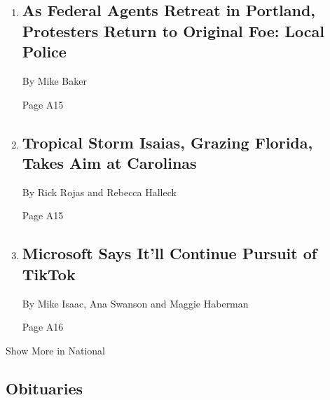 \begin{enumerate}
\def\labelenumi{\arabic{enumi}.}
\item
  \href{/2020/08/02/us/portland-protests-.html}{}

  \hypertarget{as-federal-agents-retreat-in-portland-protesters-return-to-original-foe-local-police-1}{%
  \subsection{As Federal Agents Retreat in Portland, Protesters Return
  to Original Foe: Local
  Police}\label{as-federal-agents-retreat-in-portland-protesters-return-to-original-foe-local-police-1}}

  By Mike Baker

  Page A15
\item
  \href{/2020/08/02/us/tropical-storm-isaias-florida-carolina.html}{}

  \hypertarget{tropical-storm-isaias-grazing-florida-takes-aim-at-carolinas}{%
  \subsection{Tropical Storm Isaias, Grazing Florida, Takes Aim at
  Carolinas}\label{tropical-storm-isaias-grazing-florida-takes-aim-at-carolinas}}

  By Rick Rojas and Rebecca Halleck

  Page A15
\item
  \href{/2020/08/02/business/economy/trump-tiktok-china-national-security.html}{}

  \hypertarget{microsoft-says-itll-continue-pursuit-of-tiktok}{%
  \subsection{Microsoft Says It'll Continue Pursuit of
  TikTok}\label{microsoft-says-itll-continue-pursuit-of-tiktok}}

  By Mike Isaac, Ana Swanson and Maggie Haberman

  Page A16
\end{enumerate}

Show More in National

\hypertarget{obituaries}{%
\subsection{Obituaries}\label{obituaries}}

